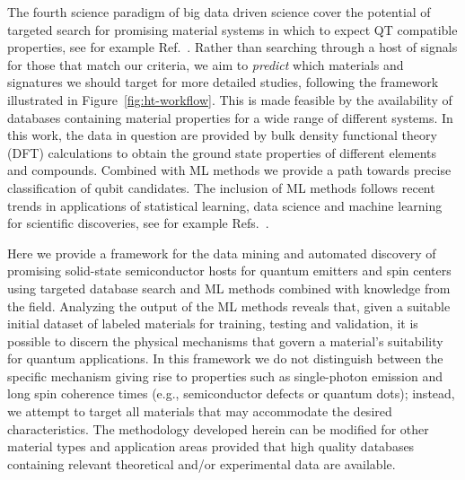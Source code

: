 \documentclass[superscriptaddress,unsortedaddress,
 amsmath,amssymb,
 aps,
]{revtex4-2}
\begin{document}
The fourth science paradigm of big data driven science cover the potential of targeted search for promising material systems in which to expect QT compatible properties, see for example Ref.~\cite{Acin2018}.
Rather than searching through a host of signals for those that match our criteria, we aim to \textit{predict} which materials and signatures we should target for more detailed studies, following the framework illustrated in Figure~\ref{fig:ht-workflow}. 
This is made feasible by the availability of databases containing material properties for a wide range of different systems. In this work, the data in question are provided by bulk density functional theory (DFT) calculations to obtain the ground state properties of different elements and compounds. Combined with ML methods we provide a path towards precise classification of qubit candidates. The inclusion of ML methods follows recent trends in applications of statistical learning, data science and machine learning for scientific discoveries, see for example Refs.~\cite{deiana2021,Carleo2019}. 

Here we provide a framework for the data mining and automated discovery of promising solid-state semiconductor hosts for quantum emitters and spin centers using targeted database search and ML methods combined with knowledge from the field. 
Analyzing the output of the ML methods reveals that, given a suitable initial dataset of labeled materials for training, testing and validation, it is possible to discern the physical mechanisms that govern a material's suitability for quantum applications.  
In this framework we do not distinguish between the specific mechanism giving rise to properties such as single-photon emission and long spin coherence times (e.g., semiconductor defects or quantum dots); instead, we attempt to target all materials that may accommodate the desired characteristics.  
The methodology developed herein can be modified for other material types and application areas provided that high quality databases containing relevant theoretical and/or experimental data are available. 
\end{document}

